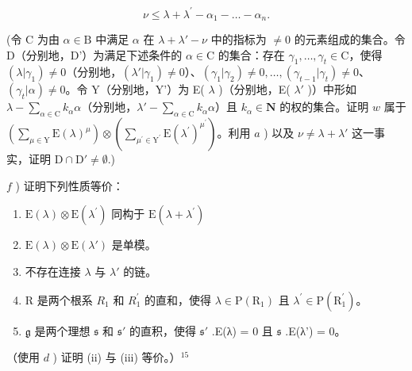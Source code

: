 \[
\nu \leq \lambda + \lambda^ {\prime} - \alpha_ {1} - \dots - \alpha_ {n}.
\]

(令 C 为由 \(\alpha \in \mathrm{B}\) 中满足 \(\alpha\) 在 \(\lambda + \lambda' - \nu\) 中的指标为 \(\neq 0\) 的元素组成的集合。令 D（分别地，D'）为满足下述条件的 \(\alpha \in \mathrm{C}\) 的集合：存在 \(\gamma_1, \ldots, \gamma_t \in \mathrm{C}\)，使得 \((\lambda|\gamma_1) \neq 0\)（分别地，\((\lambda'|\gamma_1) \neq 0\)）、\((\gamma_1|\gamma_2) \neq 0, \ldots, (\gamma_{t-1}|\gamma_t) \neq 0\)、\((\gamma_t|\alpha) \neq 0\)。令 Y（分别地，Y'）为 E( \(\lambda\) )（分别地，E( \(\lambda'\) )）中形如 \(\lambda - \sum_{\alpha \in \mathrm{C}} k_\alpha\alpha\)（分别地，\(\lambda' - \sum_{\alpha \in \mathrm{C}} k_\alpha\alpha\)）且 \(k_\alpha \in \mathbf{N}\) 的权的集合。证明 \(w\) 属于 \(\left(\sum_{\mu \in \mathrm{Y}}\mathrm{E}(\lambda)^{\mu}\right)\otimes \left(\sum_{\mu^{\prime}\in \mathrm{Y}^{\prime}}\mathrm{E}(\lambda^{\prime})^{\mu^{\prime}}\right)\)。利用 \(a\) ) 以及 \(\nu \neq \lambda +\lambda '\) 这一事实，证明 \(\mathrm{D}\cap \mathrm{D}'\neq \emptyset .\))

\(f\) ) 证明下列性质等价：

\begin{enumerate}
\def\labelenumi{(\roman{enumi})}
\item
  \(\mathrm{E}(\lambda)\otimes \mathrm{E}(\lambda^{\prime})\) 同构于 \(\mathrm{E}(\lambda +\lambda^{\prime})\)
\item
  \(\mathrm{E}(\lambda) \otimes \mathrm{E}(\lambda')\) 是单模。
\item
  不存在连接 \(\lambda\) 与 \(\lambda'\) 的链。
\item
  R 是两个根系 \(R_{1}\) 和 \(R_{1}^{\prime}\) 的直和，使得 \(\lambda \in \mathrm{P}(\mathrm{R}_{1})\) 且 \(\lambda^{\prime} \in \mathrm{P}(\mathrm{R}_{1}^{\prime})\)。
\item
  \(\mathfrak{g}\) 是两个理想 \(\mathfrak{s}\) 和 \(\mathfrak{s}'\) 的直积，使得 \(\mathfrak{s}'\) .E(λ) = 0 且 \(\mathfrak{s}\) .E(λ') = 0。
\end{enumerate}

（使用 \(d\) ) 证明 (ii) 与 (iii) 等价。）\(^{15}\)

